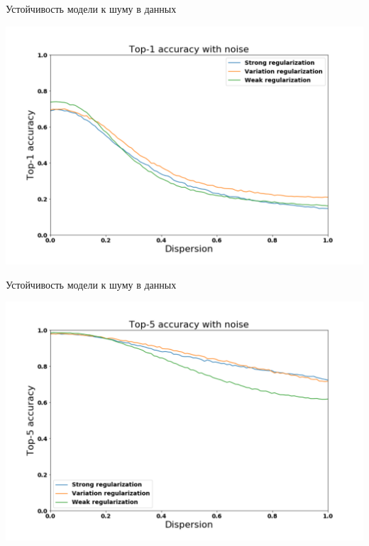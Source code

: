 \documentclass[10pt]{beamer}
\begin{document}
\begin{frame}{Устойчивость модели к шуму в данных}

\centering
\includegraphics[width=1\linewidth]{slides_t1_noise_graph.pdf}
\caption{}
\label{}

\end{frame}

\begin{frame}{Устойчивость модели к шуму в данных}

\centering
\includegraphics[width=1\linewidth]{slides_t5_noise_graph.pdf}
\caption{}
\label{}

\end{frame}
\end{document}
